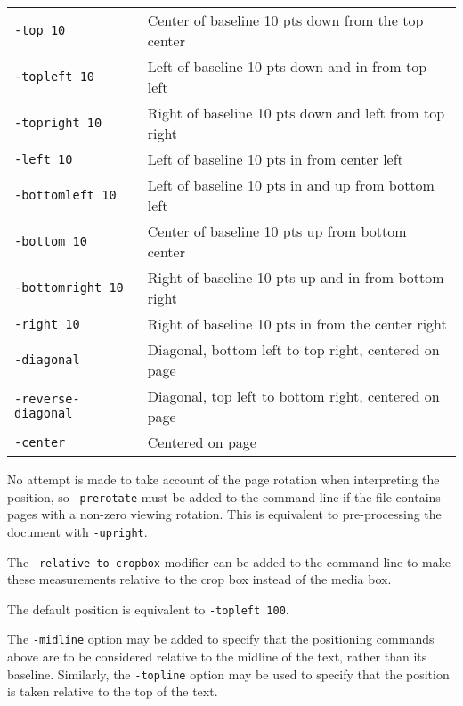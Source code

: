 \documentclass{book}
\begin{document}
  \begin{framed}
    \noindent\begin{tabular}{ll}
      \small\verb!-top 10! & Center of baseline 10 pts down from the top center \\
      \small\verb!-topleft 10! & Left of baseline 10 pts down and in from top left \\
      \small\verb!-topright 10! & Right of baseline 10 pts down and left from top right\\
      \small\verb!-left 10! & Left of baseline 10 pts in from center left \\
      \small\verb!-bottomleft 10! & Left of baseline 10 pts in and up from bottom left \\
      \small\verb!-bottom 10! & Center of baseline 10 pts up from bottom center\\
      \small\verb!-bottomright 10! & Right of baseline 10 pts up and in from bottom right \\
      \small\verb!-right 10! & Right of baseline 10 pts in from the center right \\
      \small\verb!-diagonal! & Diagonal, bottom left to top right, centered on page\\
      \small\verb!-reverse-diagonal! & Diagonal, top left to bottom right, centered on page\\    
      \small\verb!-center! & Centered on page\\
    \end{tabular}
  \end{framed}

\noindent No attempt is made to take account of the page rotation when interpreting the
position, so \texttt{-prerotate} must be added to the command line if the file
contains pages with a non-zero viewing rotation. This is equivalent to
pre-processing the document with \texttt{-upright}.
   
The \texttt{-relative-to-cropbox} modifier can be added to the command line to
make these measurements relative to the crop box instead of the media box.

The default position is equivalent to \texttt{-topleft 100}.

The \texttt{-midline} option may be added to specify that the positioning
commands above are to be considered relative to the midline of the text, rather
than its baseline. Similarly, the \texttt{-topline} option may be used to specify that the position is taken relative to the top of the text.
\end{document}

